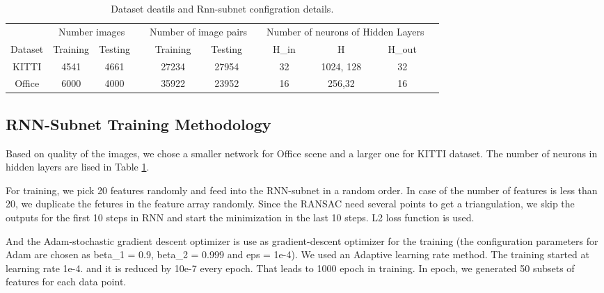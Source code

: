 \documentclass{article}
\begin{document}
\begin{table}[h]
  \centering
  \begin{tabular}{ccccccccccc}

       \toprule  
&  \multicolumn{2}{c}{Number images}&& \multicolumn{2}{c}{Number of image pairs} && \multicolumn{3}{c}{Number of neurons of Hidden Layers}  \\
    \cline{2-3}
    \cline{5-6}
    \cline{8-10}
            Dataset & Training  &Testing && Training  &Testing  &&H\_in& H          & H\_out\\
  \hline KITTI      &4541       &4661     &&27234       &27954      &&   32 & 1024, 128 & 32       \\ 
  \hline Office     &6000       &4000     &&35922       &23952      &&  16 &256,32    & 16   \\ 
    \bottomrule
  \end{tabular}
  \caption{Dataset deatils and Rnn-subnet configration details.}
  \label{results}
\end{table}




\subsection{RNN-Subnet Training Methodology}

Based on quality of the images, we chose a smaller network for Office scene and a larger one for KITTI dataset. The number of neurons in hidden layers are lised in Table \ref{results}.

For training, we pick 20 features randomly and feed into the RNN-subnet in a random order. In case of the number of features is less than 20, we duplicate the fetures in the feature array randomly. Since  the RANSAC need several points to get a triangulation, we skip the outputs for the first 10 steps in RNN and start the minimization in the last 10 steps. L2 loss function is used.

And the Adam-stochastic gradient descent  optimizer is use as gradient-descent optimizer for the training (the configuration
parameters for Adam are chosen as beta\_1 = 0.9, beta\_2
= 0.999 and eps = 1e-4). We used an Adaptive learning rate method. The training started at learning rate 1e-4. and it is reduced by 10e-7 every epoch. That leads to 1000 epoch in training.
In epoch, we generated 50 subsets of features for each data point.
\end{document}
